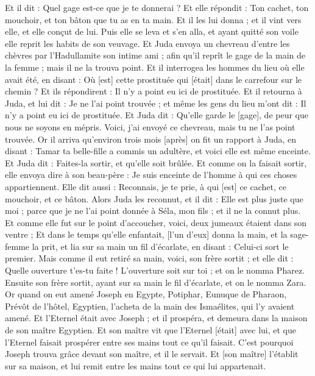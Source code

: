 \begin{multicols}{2}
Et il dit : Quel gage est-ce que je te donnerai ? Et elle répondit : Ton cachet, ton mouchoir, et ton bâton que tu as en ta main. Et il les lui donna ; et il vint vers elle, et elle conçut de lui.
Puis elle se leva et s'en alla, et ayant quitté son voile elle reprit les habits de son veuvage.
Et Juda envoya un chevreau d'entre les chèvres par l'Hadullamite son intime ami ; afin qu'il reprît le gage de la main de la femme ; mais il ne la trouva point.
Et il interrogea les hommes du lieu où elle avait été, en disant : Où [est] cette prostituée qui [était] dans le carrefour sur le chemin ? Et ils répondirent : Il n'y a point eu ici de prostituée.
Et il retourna à Juda, et lui dit : Je ne l'ai point trouvée ; et même les gens du lieu m'ont dit : Il n'y a point eu ici de prostituée.
Et Juda dit : Qu'elle garde le [gage], de peur que nous ne soyons en mépris. Voici, j'ai envoyé ce chevreau, mais tu ne l'as point trouvée.
Or il arriva qu'environ trois mois [après] on fit un rapport à Juda, en disant : Tamar ta belle-fille a commis un adultère, et voici elle est même enceinte. Et Juda dit : Faites-la sortir, et qu'elle soit brûlée.
Et comme on la faisait sortir, elle envoya dire à son beau-père : Je suis enceinte de l'homme à qui ces choses appartiennent. Elle dit aussi : Reconnais, je te prie, à qui [est] ce cachet, ce mouchoir, et ce bâton.
Alors Juda les reconnut, et il dit : Elle est plus juste que moi ; parce que je ne l'ai point donnée à Séla, mon fils ; et il ne la connut plus.
Et comme elle fut sur le point d'accoucher, voici, deux jumeaux étaient dans son ventre ;
Et dans le temps qu'elle enfantait, [l'un d'eux] donna la main, et la sage-femme la prit, et lia sur sa main un fil d'écarlate, en disant : Celui-ci sort le premier.
Mais comme il eut retiré sa main, voici, son frère sortit ; et elle dit : Quelle ouverture t'es-tu faite ! L'ouverture soit sur toi ; et on le nomma Pharez.
Ensuite son frère sortit, ayant sur sa main le fil d'écarlate, et on le nomma Zara.
\VerseOne{}Or quand on eut amené Joseph en Egypte, Potiphar, Eunuque de Pharaon, Prévôt de l'hôtel, Egyptien, l'acheta de la main des Ismaélites, qui l'y avaient amené.
Et l'Eternel était avec Joseph ; et il prospéra, et demeura dans la maison de son maître Egyptien.
Et son maître vit que l'Eternel [était] avec lui, et que l'Eternel faisait prospérer entre ses mains tout ce qu'il faisait.
C'est pourquoi Joseph trouva grâce devant son maître, et il le servait. Et [son maître] l'établit sur sa maison, et lui remit entre les mains tout ce qui lui appartenait.

\end{multicols}
